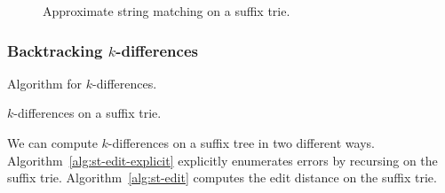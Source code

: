 \begin{figure}[h]
\begin{center}
\caption{Approximate string matching on a suffix trie.}
\label{fig:st-hamming}

\end{center}
\end{figure}


\subsubsection{Backtracking $k$-differences}

Algorithm for $k$-differences.

\begin{algorithm}[h]
\caption{$k$-differences on a suffix trie.}
\label{alg:st-edit}
\begin{algorithmic}[1]
		\State \Report {}
			\Repeat
				\State {}
		\EndIf
	\EndIf
\EndProcedure
\end{algorithmic}
\end{algorithm}

We can compute $k$-differences on a suffix tree in two different ways. Algorithm~\ref{alg:st-edit-explicit} explicitly enumerates errors by recursing on the suffix trie. Algorithm~\ref{alg:st-edit} computes the edit distance on the suffix trie.

%


